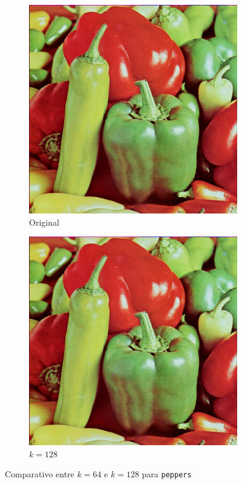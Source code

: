 \documentclass[brazilian,a4paper,twocolumn]{article}
\begin{document}
\begin{figure}[H]
\begin{subfigure}{0.15\textwidth}
                \includegraphics[width=\textwidth,keepaspectratio]{peppers}
                \caption{Original}
                \label{fig:peppers-original}
            \end{subfigure}
            \begin{subfigure}{0.15\textwidth}
                \includegraphics[width=\textwidth,keepaspectratio]{peppers-128}
                \caption{$k=128$}
                \label{fig:peppers-128}
            \end{subfigure}

            \caption{Comparativo entre $k=64$ e $k=128$ para \texttt{peppers}}
            \label{fig:peppers-comparativo}
        \end{figure}
\end{document}
